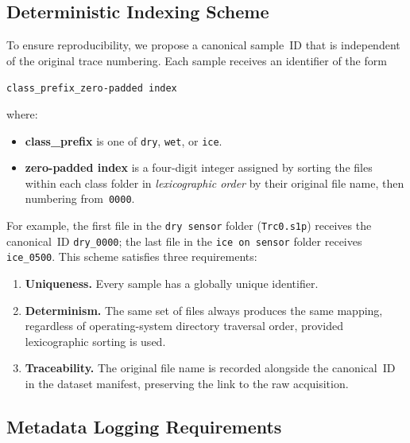 \subsection{Deterministic Indexing Scheme}
\label{sec:dataset:indexing}

To ensure reproducibility, we propose a canonical sample~ID that is
independent of the original trace numbering.  Each sample receives an
identifier of the form

\begin{center}
    \texttt{\textlangle{}class\_prefix\textrangle{}\_\textlangle{}zero-padded index\textrangle{}}
\end{center}

\noindent
where:
\begin{itemize}
    \item \textbf{class\_prefix} is one of \texttt{dry}, \texttt{wet},
        or \texttt{ice}.
    \item \textbf{zero-padded index} is a four-digit integer assigned by
        sorting the files within each class folder in \emph{lexicographic
        order} by their original file name, then numbering from~\texttt{0000}.
\end{itemize}

\noindent
For example, the first file in the \texttt{dry sensor} folder
(\texttt{Trc0.s1p}) receives the canonical~ID \texttt{dry\_0000}; the
last file in the \texttt{ice on sensor} folder receives
\texttt{ice\_0500}.  This scheme satisfies three requirements:

\begin{enumerate}
    \item \textbf{Uniqueness.}  Every sample has a globally unique
        identifier.
    \item \textbf{Determinism.}  The same set of files always produces
        the same mapping, regardless of operating-system directory
        traversal order, provided lexicographic sorting is used.
    \item \textbf{Traceability.}  The original file name is recorded
        alongside the canonical~ID in the dataset manifest, preserving
        the link to the raw acquisition.
\end{enumerate}

\subsection{Metadata Logging Requirements}
\label{sec:dataset:metadata}

